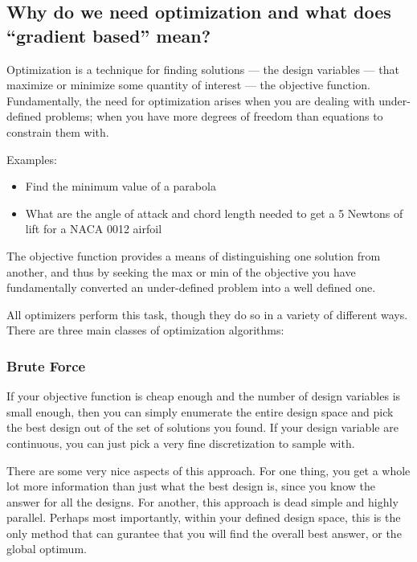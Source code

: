 \documentclass[conf]{new-aiaa}
\begin{document}
    \subsection*{Why do we need optimization and what does ``gradient based'' mean?}
        
        Optimization is a technique for finding solutions --- the design variables --- that maximize or minimize some quantity of interest  --- the objective function. 
        Fundamentally, the need for optimization arises when you are dealing with under-defined problems; when you have more degrees of freedom than equations to constrain them with. 

        Examples: 
        \begin{itemize}
            \item Find the minimum value of a parabola
            \item What are the angle of attack and chord length needed to get a 5 Newtons of lift for a NACA 0012 airfoil
        \end{itemize}

        The objective function provides a means of distinguishing one solution from another, 
        and thus by seeking the max or min of the objective you have fundamentally converted an under-defined problem into a well defined one. 

        All optimizers perform this task, though they do so in a variety of different ways. 
        There are three main classes of optimization algorithms: 
        
        \subsubsection{Brute Force}
            If your objective function is cheap enough and the number of design variables is small enough, then you can simply enumerate the entire design space and pick the best design out of the set of solutions you found. 
            If your design variable are continuous, you can just pick a very fine discretization to sample with. 

            There are some very nice aspects of this approach. For one thing, you get a whole lot more information than just what the best design is, since you know the answer for all the designs. 
            For another, this approach is dead simple and highly parallel. 
            Perhaps most importantly, within your defined design space, this is the only method that can gurantee that you will find the overall best answer, or the global optimum. 
\end{document}
